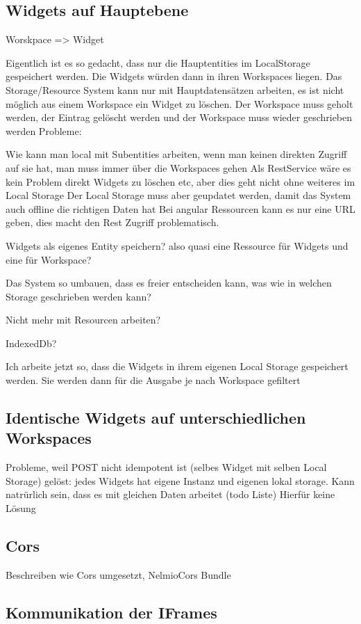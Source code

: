 \subsection{Widgets auf Hauptebene}

Worskpace => Widget

Eigentlich ist es so gedacht, dass nur die Hauptentities im LocalStorage gespeichert werden.
Die Widgets würden dann in ihren Workspaces liegen. Das Storage/Resource System kann nur mit Hauptdatensätzen arbeiten, es ist nicht möglich aus einem Workspace ein Widget zu löschen. Der Workspace muss geholt werden, der Eintrag gelöscht werden und der Workspace muss wieder geschrieben werden
Probleme:

    Wie kann man local mit Subentities arbeiten, wenn man keinen direkten Zugriff auf sie hat, man muss immer über die Workspaces gehen
    Als RestService wäre es kein Problem direkt Widgets zu löschen etc, aber dies geht nicht ohne weiteres im Local Storage
    Der Local Storage muss aber geupdatet werden, damit das System auch offline die richtigen Daten hat
    Bei angular Ressourcen kann es nur eine URL geben, dies macht den Rest Zugriff problematisch.

 

Widgets als eigenes Entity speichern? also quasi eine Ressource für Widgets und eine für Workspace?

Das System so umbauen, dass es freier entscheiden kann, was wie in welchen Storage geschrieben werden kann?

Nicht mehr mit Resourcen arbeiten?

IndexedDb?

Ich arbeite jetzt so, dass die Widgets in ihrem eigenen Local Storage gespeichert werden. Sie werden dann für die Ausgabe je nach Workspace gefiltert



\subsection{Identische Widgets auf unterschiedlichen Workspaces}
Probleme, weil POST nicht idempotent ist (selbes Widget mit selben Local Storage)
gelöst: jedes Widgets hat eigene Instanz und eigenen lokal storage. Kann natrürlich sein, dass es mit gleichen Daten arbeitet (todo Liste) Hierfür keine Lösung

\subsection{Cors}

Beschreiben wie Cors umgesetzt, NelmioCors Bundle

\subsection{Kommunikation der IFrames}
